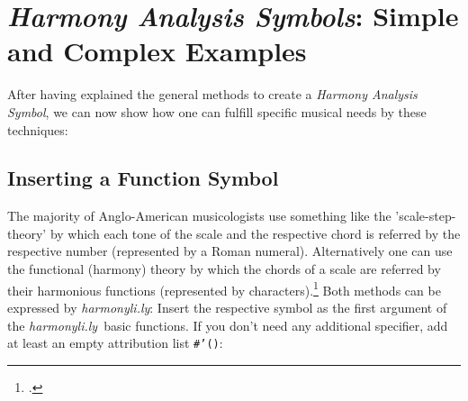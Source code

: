 \documentclass[
  DIV=calc,
  BCOR=5mm,
  12pt,
  headings=small,
  oneside,
  abstract=true,
  toc=bib,
  xcolor=dvipsnames,
  openany,
  ngerman,english]{scrartcl}
\newcommand{\hlyn}[0]{\textit{harmonyli.ly}}
\newcommand{\has}[1]{\textit{Harmony Analysis Symbol#1}}
\begin{document}
\section{\has{s}: Simple and Complex Examples}

After having explained the general methods to create a \has{}, we can now show
how one can fulfill specific musical needs by these techniques:

\subsection{Inserting a Function Symbol}

The majority of Anglo-American musicologists use something like the
'scale-step-theory' by which each tone of the scale and the respective chord is
referred by the respective number (represented by a Roman numeral).
Alternatively one can use the functional (harmony) theory by which the chords of
a scale are referred by their harmonious functions (represented by
characters).\footcite[for dedails cf.][\nopage wp]{wpFunctionTheory2019a} Both
methods can be expressed by \hlyn: Insert the respective symbol as the first
argument of the \hlyn\ basic functions. If you don't need any additional
specifier, add at least an empty attribution list \texttt{\#'()}:
\end{document}
